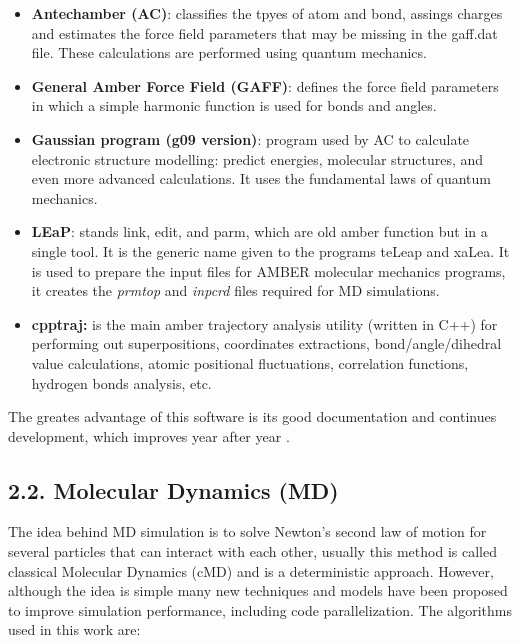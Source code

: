 \documentclass[
  journal=usp, %
  manuscript=final-report,
  year=2023,
  volume=1,
]{cup-journal}
\begin{document}
\begin{itemize}
    \item \textbf{Antechamber (AC)}: classifies the tpyes of atom and bond, assings charges and estimates the force field parameters that may be missing in the gaff.dat file. These calculations are performed using quantum mechanics.
    \item  \textbf{General Amber Force Field (GAFF)}: defines the force field parameters in which a simple harmonic function is used for bonds and angles.
    \item \textbf{Gaussian program (g09 version)}: program used by AC to calculate electronic structure modelling: predict energies, molecular structures, and even more advanced calculations. It uses the fundamental laws of quantum mechanics.
    \item \textbf{LEaP}: stands link, edit, and parm, which are old amber function but in a single tool. It is the generic name given to the programs teLeap and xaLea. It is used to prepare the input files for AMBER molecular mechanics programs, it creates the \textit{prmtop} and \textit{inpcrd} files required for MD simulations.
    \item \textbf{cpptraj:} is the main amber trajectory analysis utility (written in C++) for performing out superpositions, coordinates extractions,  bond/angle/dihedral value calculations, atomic positional fluctuations, correlation functions, hydrogen bonds analysis, etc.
\end{itemize}

The greates advantage of this software is its good documentation and continues development, which improves year after year \cite{amber}.

\subsection{2.2. Molecular Dynamics (MD)}

The idea behind MD simulation is to solve Newton's second law of motion for several particles that can interact with each other, usually this method is called classical Molecular Dynamics (cMD) and is a deterministic approach. However, although the idea is simple many new techniques and models have been proposed to improve simulation performance, including code parallelization. The algorithms used in this work are:
\end{document}
